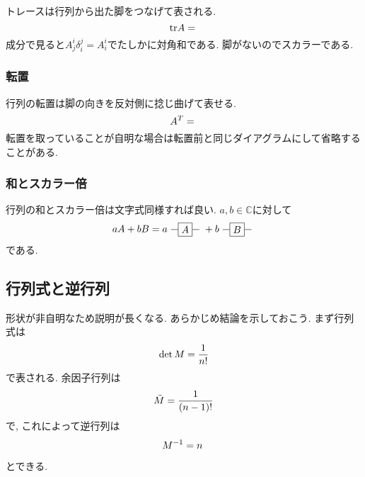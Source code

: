 \documentclass[dvipdfmx]{jsarticle}
\begin{document}
トレースは行列から出た脚をつなげて表される.
\begin{equation*}
    \mathrm{tr}A
    =
    \vcenter{\hbox{}}
\end{equation*}
成分で見ると$A^i_j\delta^j_i=A_i^i$でたしかに対角和である.
脚がないのでスカラーである.


\subsubsection{転置}

行列の転置は脚の向きを反対側に捻じ曲げて表せる.
\begin{equation*}
    A^T
    =
    \vcenter{\hbox{}}
\end{equation*}
転置を取っていることが自明な場合は転置前と同じダイアグラムにして省略することがある.


\subsubsection{和とスカラー倍}

行列の和とスカラー倍は文字式同様すれば良い.
$a, b\in\mathbb{C}$に対して
\begin{equation*}
    aA+bB
    =
    a\vcenter{\hbox{
        \begin{tikzpicture}
            \node at(0,0)[anchor=center, draw, rectangle](A){$A$};
            \draw(A.west)--++(-.25,0);
            \draw(A.east)--++(.25,0);
        \end{tikzpicture}
    }}
    +
    b
    \vcenter{\hbox{
        \begin{tikzpicture}
            \node at(0,0)[anchor=center, draw, rectangle](B){$B$};
            \draw(B.west)--++(-.25,0);
            \draw(B.east)--++(.25,0);
        \end{tikzpicture}
    }}
\end{equation*}
である.


\subsection{行列式と逆行列}
\label{sec: matrix: det and inverse}

形状が非自明なため説明が長くなる.
あらかじめ結論を示しておこう.
まず行列式は
\begin{equation}
    \label{eq: matrix: det M result}
    \det M
    =
    \frac{1}{n!}
    \vcenter{\hbox{}}
\end{equation}
で表される.
余因子行列は
\begin{equation*}
    \tilde{M}
    =
    \frac{1}{(n-1)!}
    \vcenter{\hbox{}}
\end{equation*}
で, これによって逆行列は
\begin{equation*}
    M^{-1}
    =
    n
    \frac{\vcenter{\hbox{}}}{\vcenter{\hbox{}}}
\end{equation*}
とできる.
\end{document}
